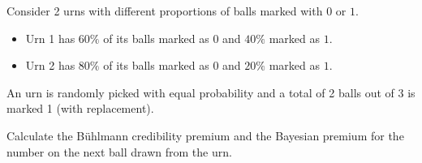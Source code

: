 \documentclass[notoc,notitlepage]{tufte-book}
\begin{document}
\begin{eg}
  Consider 2 urns with different proportions of balls marked with $0$ or $1$.
  \begin{itemize}
    \item Urn 1 has $60\%$ of its balls marked as $0$ and $40\%$ marked as $1$.
    \item Urn 2 has $80\%$ of its balls marked as $0$ and $20\%$ marked as $1$.
  \end{itemize}
  An urn is randomly picked with equal probability and a total of 2 balls out of
  3 is marked 1 (with replacement).

  Calculate the B\"{u}hlmann credibility premium and the Bayesian premium for
  the number on the next ball drawn from the urn.
\end{eg}
\end{document}
